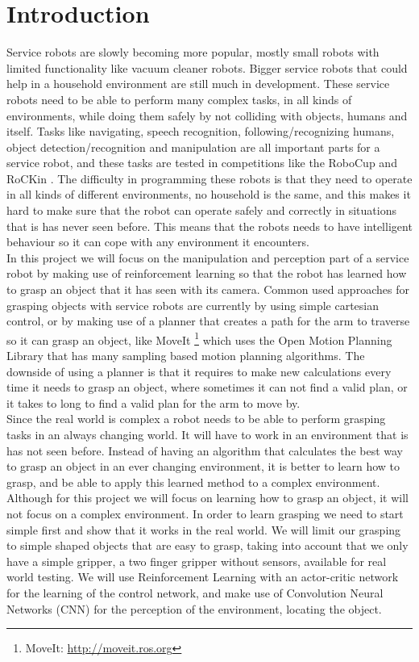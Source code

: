 \section{Introduction}
Service robots are slowly becoming more popular, mostly small robots with limited functionality like vacuum cleaner robots. Bigger service robots that could help in a household environment are still much in development. 
These service robots need to be able to perform many complex tasks, in all kinds of environments, while doing them safely by not colliding with objects, humans and itself.   
Tasks like navigating, speech recognition, following/recognizing humans, object detection/recognition and manipulation are all important parts for a service robot, 
and these tasks are tested in competitions like the RoboCup \cite{robocup} and RoCKin \cite{rockin}. The difficulty in programming these robots is that they need to operate in all kinds of different environments, no household is the same, 
and this makes it hard to make sure that the robot can operate safely and correctly in situations that is has never seen before. This means that the robots needs to have intelligent behaviour so it can cope with any environment it encounters. \\
In this project we will focus on the manipulation and perception part of a service robot by making use of reinforcement learning so that the robot has learned how to grasp an object that it has seen with its camera.  
Common used approaches for grasping objects with service robots are currently by using simple cartesian control, or by making use of a planner that creates a path for the arm to traverse so it can grasp an object, 
like MoveIt \footnote{MoveIt: \url{http://moveit.ros.org}} which uses the Open Motion Planning Library \cite{ompl} that has many sampling based motion planning algorithms. 
The downside of using a planner is that it requires to make new calculations every time it needs to grasp an object, where sometimes it can not find a valid plan, or it takes to long to find a valid plan
for the arm to move by. \\
Since the real world is complex a robot needs to be able to perform grasping tasks in an always changing world. It will have to work in an environment that is has not seen before. Instead of having an algorithm that calculates
the best way to grasp an object in an ever changing environment, it is better to learn how to grasp, and be able to apply this learned method to a complex environment. Although for this project we will focus on learning 
how to grasp an object, it will not focus on a complex environment. In order to learn grasping we need to start simple first and show that it works in the real world. We will limit our grasping to simple shaped objects 
that are easy to grasp, taking into account that we only have a simple gripper, a two finger gripper without sensors, available for real world testing. We will use Reinforcement Learning with an actor-critic network for the learning 
of the control network, and make use of Convolution Neural Networks (CNN) \cite{cnn} for the perception of the environment, locating the object. 


